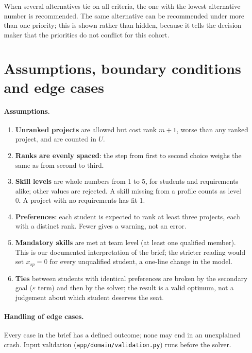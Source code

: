 \documentclass[11pt,a4paper]{article}
\newcommand{\code}[1]{\texttt{#1}}
\begin{document}
When several alternatives tie on all criteria, the one with the lowest
alternative number is recommended. The same alternative can be recommended
under more than one priority; this is shown rather than hidden, because it
tells the decision-maker that the priorities do not conflict for this cohort.

\section{Assumptions, boundary conditions and edge cases}

\paragraph{Assumptions.}
\begin{enumerate}
  \item \textbf{Unranked projects} are allowed but cost rank $m + 1$, worse
        than any ranked project, and are counted in $U$.
  \item \textbf{Ranks are evenly spaced}: the step from first to second
        choice weighs the same as from second to third.
  \item \textbf{Skill levels} are whole numbers from 1 to 5, for students
        and requirements alike; other values are rejected. A skill missing
        from a profile counts as level 0. A project with no requirements has
        fit 1.
  \item \textbf{Preferences}: each student is expected to rank at least
        three projects, each with a distinct rank. Fewer gives a warning,
        not an error.
  \item \textbf{Mandatory skills} are met at team level (at least one
        qualified member). This is our documented interpretation of the
        brief; the stricter reading would set $x_{sp} = 0$ for every
        unqualified student, a one-line change in the model.
  \item \textbf{Ties} between students with identical preferences are broken
        by the secondary goal ($\varepsilon$ term) and then by the solver; the
        result is a valid optimum, not a judgement about which student
        deserves the seat.
\end{enumerate}

\paragraph{Handling of edge cases.}
Every case in the brief has a defined outcome; none may end in an unexplained
crash. Input validation (\code{app/domain/validation.py}) runs before the
solver.
\end{document}
